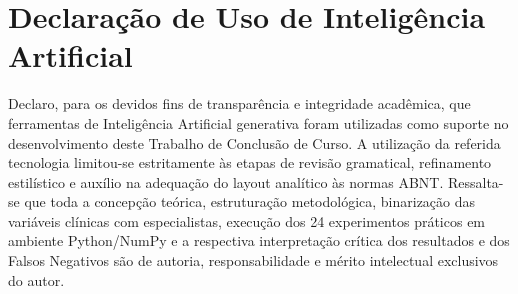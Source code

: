 \chapter*{Declara\c c\~ao de Uso de Intelig\^encia Artificial}

Declaro, para os devidos fins de transpar\^encia e integridade acad\^emica, que ferramentas de Intelig\^encia Artificial generativa foram utilizadas como suporte no desenvolvimento deste Trabalho de Conclus\~ao de Curso. A utiliza\c c\~ao da referida tecnologia limitou-se estritamente \`as etapas de revis\~ao gramatical, refinamento estil\'istico e aux\'ilio na adequa\c c\~ao do layout anal\'itico \`as normas ABNT. Ressalta-se que toda a concep\c c\~ao te\'orica, estrutura\c c\~ao metodol\'ogica, binariza\c c\~ao das vari\'aveis cl\'inicas com especialistas, execu\c c\~ao dos 24 experimentos pr\'aticos em ambiente Python/NumPy e a respectiva interpreta\c c\~ao cr\'itica dos resultados e dos Falsos Negativos s\~ao de autoria, responsabilidade e m\'erito intelectual exclusivos do autor.
